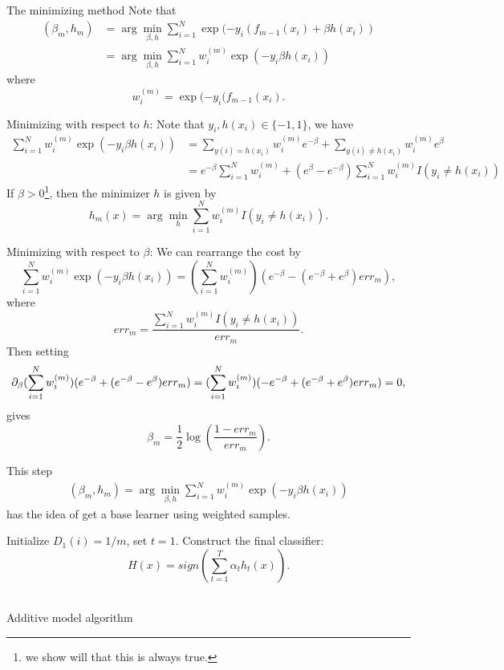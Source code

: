 \begin{refsection}
The minimizing method
Note that
\begin{align*}
(\beta_m,h_m) &= \arg\min_{\beta,h} \sum_{i=1}^N \exp(-y_i(f_{m-1}(x_i)+\beta h(x_i)) \\
&= \arg\min_{\beta,h} \sum_{i=1}^N w_i^{(m)}\exp(-y_i\beta h(x_i))
\end{align*}
where 
$$w_i^{(m)} = \exp(-y_i(f_{m-1}(x_i).$$


Minimizing with respect to $h$:
Note that $y_i,h(x_i)\in\{-1,1\}$, we have
\begin{align*}
\sum_{i=1}^N w_i^{(m)}\exp(-y_i\beta h(x_i)) &= \sum_{y(i)=h(x_i)} w_i^{(m)}e^{-\beta} + \sum_{y(i)\neq h(x_i)} w_i^{(m)}e^{\beta} \\
&= e^{-\beta}\sum_{i=1}^N w_i^{(m)} + (e^\beta - e^{-\beta})\sum_{i=1}^N w_i^{(m)}I(y_i\neq h(x_i))
\end{align*}
If $\beta > 0$\footnote{we show will that this is always true.}, then the minimizer $h$ is given by
$$h_m(x) = \arg\min_{h} \sum_{i=1}^N w_i^{(m)}I(y_i\neq h(x_i)).$$

Minimizing with respect to $\beta$:
We can rearrange the cost by
$$\sum_{i=1}^N w_i^{(m)}\exp(-y_i\beta h(x_i)) = (\sum_{i=1}^N w_i^{(m)})(e^{-\beta}-(e^{-\beta}+e^\beta) err_m),$$
where
$$err_m = \frac{\sum_{i=1}^N w_i^{(m)}I(y_i\neq h(x_i))}{err_m}.$$
Then setting
$$\partial_\beta  (\sum_{i=1}^N w_i^{(m)})(e^{-\beta}+(e^{-\beta}-e^\beta) err_m) =  (\sum_{i=1}^N w_i^{(m)})(-e^{-\beta}+(e^{-\beta}+e^\beta) err_m) =0, $$
gives 
$$\beta_m = \frac{1}{2}\log(\frac{1-err_m}{err_m}).$$


\begin{remark}
This step	
\begin{align*}
(\beta_m,h_m) = \arg\min_{\beta,h} \sum_{i=1}^N w_i^{(m)}\exp(-y_i\beta h(x_i))
\end{align*}	
has the idea of get a base learner using weighted samples. 
\end{remark}


\begin{algorithm}[H]
	\SetAlgoLined
	Initialize $D_1(i) = 1/m$, set $t = 1$.
	Construct the final classifier:
	$$H(x) = sign(\sum_{t=1}^T \alpha_t h_t(x)).$$	\\
	\caption{Additive model algorithm}
\end{algorithm}



\end{refsection}
